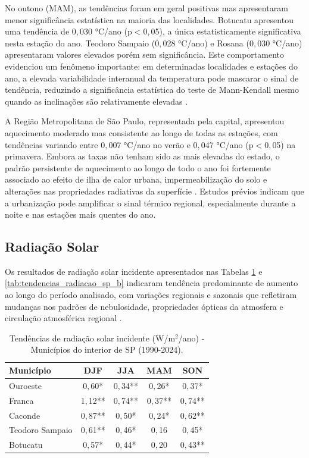 No outono (MAM), as tendências foram em geral positivas mas apresentaram menor significância estatística na maioria das localidades. Botucatu apresentou uma tendência de 0${,}$030 °C/ano (p$<$0${,}$05), a única estatisticamente significativa nesta estação do ano. Teodoro Sampaio (0${,}$028 °C/ano) e Rosana (0${,}$030 °C/ano) apresentaram valores elevados porém sem significância. Este comportamento evidenciou um fenômeno importante: em determinadas localidades e estações do ano, a elevada variabilidade interanual da temperatura pode mascarar o sinal de tendência, reduzindo a significância estatística do teste de Mann-Kendall mesmo quando as inclinações são relativamente elevadas \citep{vonstorch1999,yue2002,wilks2011}.

A Região Metropolitana de São Paulo, representada pela capital, apresentou aquecimento moderado mas consistente ao longo de todas as estações, com tendências variando entre 0${,}$007 °C/ano no verão e 0${,}$047 °C/ano (p$<$0${,}$05) na primavera. Embora as taxas não tenham sido as mais elevadas do estado, o padrão persistente de aquecimento ao longo de todo o ano foi fortemente associado ao efeito de ilha de calor urbana, impermeabilização do solo e alterações nas propriedades radiativas da superfície \citep{Campelo}. Estudos prévios indicam que a urbanização pode amplificar o sinal térmico regional, especialmente durante a noite e nas estações mais quentes do ano.

\subsection{Radiação Solar}

Os resultados de radiação solar incidente apresentados nas Tabelas \ref{tab:tendencias_radiacao_sp_a} e \ref{tab:tendencias_radiacao_sp_b} indicaram tendência predominante de aumento ao longo do período analisado, com variações regionais e sazonais que refletiram mudanças nos padrões de nebulosidade, propriedades ópticas da atmosfera e circulação atmosférica regional \citep{wild2012, yamasoe2021}.

\begin{table}[H]
	\centering
	\caption{Tendências de radiação solar incidente (W/m$^2$/ano) - Municípios do interior de SP (1990-2024).}
	\label{tab:tendencias_radiacao_sp_a}
	\small
	\begin{tabular}{lcccc}
		\hline
		\textbf{Município} & \textbf{DJF} & \textbf{JJA} & \textbf{MAM} & \textbf{SON} \\
		\hline
		Ouroeste & 0${,}$60*& 0${,}$34** & 0${,}$26*& 0${,}$37*\\
		Franca& 1${,}$12** & 0${,}$74** & 0${,}$37** & 0${,}$74** \\
		Caconde  & 0${,}$87** & 0${,}$50*& 0${,}$24*& 0${,}$62** \\
		Teodoro Sampaio & 0${,}$61** & 0${,}$46*& 0${,}$16& 0${,}$45*\\
		Botucatu   & 0${,}$57*& 0${,}$44*& 0${,}$20& 0${,}$43** \\
		\hline
	\end{tabular}
\end{table}

